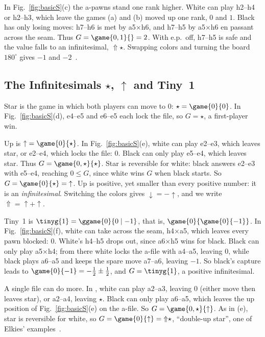In Fig.~\ref{fig:basicS}(c) the a-pawns stand one rank higher. White can play h2--h4 or h2--h3, which leave the
games (a) and (b) moved up one rank, $0$ and $1$. Black has only losing moves: h7--h6 is met by
a5$\times$h6, and h7--h5 by a5$\times$h6 en passant across the seam. Thus $G=\game{0,1}{}=2$. With e.p.\
off, h7--h5 is safe and the value falls to an infinitesimal, ${\Uparrow}\star$. Swapping colors and turning the board $180^\circ$ gives $-1$ and
$-2$~\cite{WuYuLandry2010}.

\subsection{The Infinitesimals \texorpdfstring{$\star$, ${\uparrow}$}{Star, Up} and Tiny~1}\label{S-basic-inf}
Star is the game in which both players can move to $0$: $\star=\game{0}{0}$. In Fig.~\ref{fig:basicS}(d),
e4--e5 and e6--e5 each lock the file, so $G=\star$, a first-player win.

Up is ${\uparrow}=\game{0}{\star}$. In Fig.~\ref{fig:basicS}(e), white can play e2--e3, which leaves star, or
e2--e4, which locks the file: $0$. Black can only play e5--e4, which leaves star. Thus
$G=\game{0,\star}{\star}$. Star is reversible for white: black answers e2--e3 with e5--e4, reaching
$0\le G$, since white wins $G$ when black starts. So $G=\game{0}{\star}={\uparrow}$. Up is positive, yet
smaller than every positive number: it is an \emph{infinitesimal}. Switching the colors gives
${\downarrow}=-{\uparrow}$, and we write ${\Uparrow}={\uparrow}+{\uparrow}$.

Tiny~1 is $\tinyg{1}=\ggame{0}{0\mid -1}$, that is, $\game{0}{\game{0}{-1}}$. In Fig.~\ref{fig:basicS}(f), white
can take across the seam, h4$\times$a5, which leaves every pawn blocked: $0$. White's h4--h5 drops out, since
a6$\times$h5 wins for black. Black can only play a5$\times$h4; from there white locks the a-file with a4--a5,
leaving $0$, while black plays a6--a5 and keeps the spare move a7--a6, leaving $-1$. So black's capture leads
to $\game{0}{-1}=-\tfrac12\pm\tfrac12$, and $G=\tinyg{1}$, a positive infinitesimal.

A single file can do more. In , white can play a2--a3, leaving $0$ (either move then leaves
star), or a2--a4, leaving $\star$. Black can only play a6--a5, which leaves the up position of
Fig.~\ref{fig:basicS}(e) on the a-file. So $G=\game{0,\star}{{\uparrow}}$. As in (e), star is reversible for
white, so $G=\game{0}{{\uparrow}}={\Uparrow}\star$, ``double-up star'', one of Elkies'
examples~\cite{Elkies1996}.
